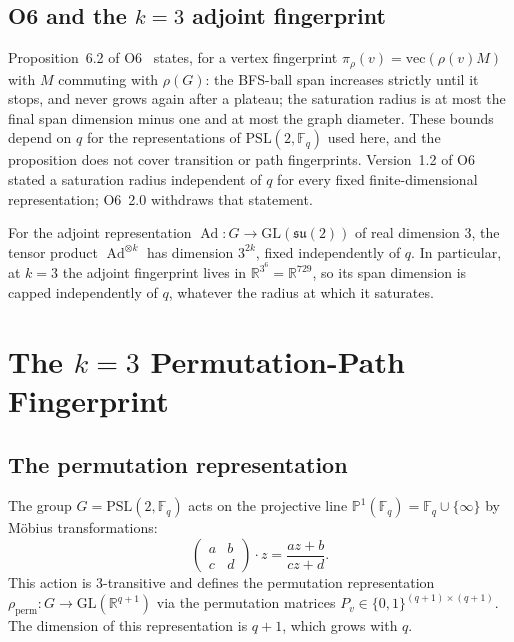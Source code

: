 \documentclass[11pt,a4paper]{article}
\theoremstyle{definition}
\theoremstyle{remark}
\DeclareMathOperator{\Ad}{Ad}
\newcommand{\R}{\mathbb{R}}
\newcommand{\F}{\mathbb{F}}
\newcommand{\Proj}{\mathbb{P}}
\newcommand{\PSL}{\mathrm{PSL}}
\newcommand{\perm}{\mathrm{perm}}
\begin{document}
  \subsection{O6 and the $k = 3$ adjoint fingerprint}
    \label{sec:background-o6}

    Proposition~6.2 of O6~\cite{Beau2026a10} states, for a vertex fingerprint
    $\pi_\rho(v) = \mathrm{vec}(\rho(v)M)$ with $M$ commuting with $\rho(G)$: the BFS-ball span
    increases strictly until it stops, and never grows again after a plateau; the saturation radius
    is at most the final span dimension minus one and at most the graph diameter.
    These bounds depend on $q$ for the representations of $\PSL(2,\F_q)$ used here, and the
    proposition does not cover transition or path fingerprints.
    Version~1.2 of O6 stated a saturation radius independent of $q$ for every fixed
    finite-dimensional representation; O6~2.0 withdraws that statement.

    For the adjoint representation $\Ad : G \to \mathrm{GL}(\mathfrak{su}(2))$ of real
    dimension 3, the tensor product $\Ad^{\otimes k}$ has dimension $3^{2k}$, fixed
    independently of $q$.
    In particular, at $k = 3$ the adjoint fingerprint lives in $\R^{3^6} = \R^{729}$,
    so its span dimension is capped independently of $q$, whatever the radius at which it
    saturates.

  \section{The $k = 3$ Permutation-Path Fingerprint}
  \label{sec:fingerprint}

  \subsection{The permutation representation}
    \label{sec:fingerprint-perm}

    The group $G = \PSL(2, \F_q)$ acts on the projective line
    $\Proj^1(\F_q) = \F_q \cup \{\infty\}$ by M\"{o}bius transformations:
    \[
      \begin{pmatrix}
            a & b \\ c & d
      \end{pmatrix} \cdot z
      = \frac{az + b}{cz + d}.
    \]
    This action is 3-transitive and defines the permutation representation
    $\rho_\perm : G \to \mathrm{GL}(\R^{q+1})$ via the permutation matrices
    $P_v \in \{0,1\}^{(q+1)\times(q+1)}$.
    The dimension of this representation is $q+1$, which grows with $q$.
\end{document}
